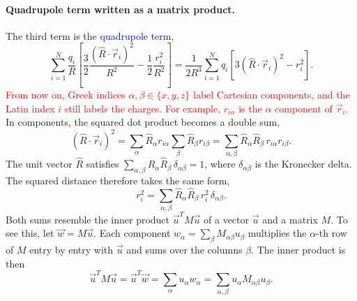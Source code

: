 \paragraph{Quadrupole term written as a matrix product.}
The third term is the \textcolor{blue}{quadrupole term},
\begin{equation*}
    \sum_{i=1}^{N}\frac{q_i}{R}\left[\frac{3}{2}\frac{(\hat R\cdot\vec r_i)^2}{R^2} - \frac{1}{2}\frac{r_i^2}{R^2}\right]
    = \frac{1}{2R^3}\sum_{i=1}^{N} q_i\left[3(\hat R\cdot\vec r_i)^2 - r_i^2\right].
\end{equation*}
\textcolor{red}{From now on, Greek indices $\alpha,\beta \in \{x,y,z\}$ label Cartesian components, and the Latin index $i$ still labels the charges. For example, $r_{i\alpha}$ is the $\alpha$ component of $\vec r_i$.} In components, the squared dot product becomes a double sum,
\begin{equation*}
    (\hat R\cdot\vec r_i)^2
    = \sum_{\alpha}\hat R_\alpha r_{i\alpha}\sum_{\beta}\hat R_\beta r_{i\beta}
    = \sum_{\alpha,\beta}\hat R_\alpha\hat R_\beta\, r_{i\alpha}r_{i\beta}.
\end{equation*}
The unit vector $\hat R$ satisfies $\sum_{\alpha,\beta}\hat R_\alpha\hat R_\beta\,\delta_{\alpha\beta} = 1$, where $\delta_{\alpha\beta}$ is the Kronecker delta. The squared distance therefore takes the same form,
\begin{equation*}
    r_i^2 = \sum_{\alpha,\beta}\hat R_\alpha\hat R_\beta\, r_i^2\,\delta_{\alpha\beta}.
\end{equation*}
Both sums resemble the inner product $\vec u^{T}M\vec u$ of a vector $\vec u$ and a matrix $M$. To see this, let $\vec w = M\vec u$. Each component $w_\alpha = \sum_\beta M_{\alpha\beta}u_\beta$ multiplies the $\alpha$-th row of $M$ entry by entry with $\vec u$ and sums over the columns $\beta$. The inner product is then
\begin{equation*}
    \vec u^{T}M\vec u = \vec u^{T}\vec w = \sum_{\alpha} u_\alpha w_\alpha = \sum_{\alpha,\beta} u_\alpha M_{\alpha\beta}u_\beta.
\end{equation*}

